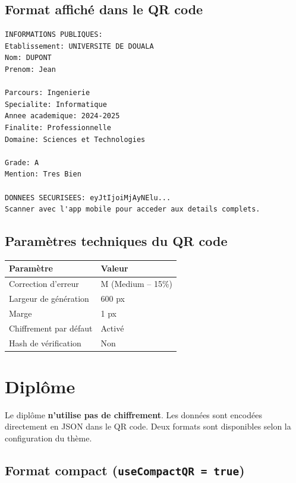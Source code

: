 \documentclass[a4paper,11pt]{article}
\begin{document}
\subsection{Format affich\'e dans le QR code}

\begin{lstlisting}[title={Contenu du QR code -- Attestation}]
INFORMATIONS PUBLIQUES:
Etablissement: UNIVERSITE DE DOUALA
Nom: DUPONT
Prenom: Jean

Parcours: Ingenierie
Specialite: Informatique
Annee academique: 2024-2025
Finalite: Professionnelle
Domaine: Sciences et Technologies

Grade: A
Mention: Tres Bien

DONNEES SECURISEES: eyJtIjoiMjAyNElu...
Scanner avec l'app mobile pour acceder aux details complets.
\end{lstlisting}

\subsection{Param\`etres techniques du QR code}

\begin{center}
\begin{tabular}{ll}
\toprule
\textbf{Param\`etre} & \textbf{Valeur} \\
\midrule
Correction d'erreur & M (Medium -- 15\%) \\
Largeur de g\'en\'eration & 600 px \\
Marge & 1 px \\
Chiffrement par d\'efaut & Activ\'e \\
Hash de v\'erification & Non \\
\bottomrule
\end{tabular}
\end{center}

\section{Dipl\^ome}

Le dipl\^ome \textbf{n'utilise pas de chiffrement}. Les donn\'ees sont encod\'ees directement en JSON dans le QR code. Deux formats sont disponibles selon la configuration du th\`eme.

\subsection{Format compact (\texttt{useCompactQR = true})}
\end{document}
